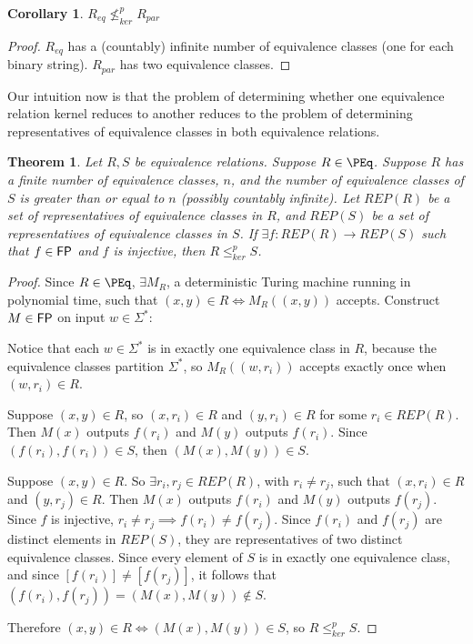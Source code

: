 \documentclass{amsart}
\newtheorem{theorem}{Theorem}[section]
\newtheorem{corollary}[corollary]{Corollary}
\theoremstyle{definition} \newtheorem{definition}[definition]{Definition}
\newcommand{\sigmastar}{\Sigma^{*}} %
\newcommand{\kr}{\leq^{p}_{ker}} %
\newcommand{\nkr}{\nleq^{p}_{ker}} %
\begin{document}
\begin{corollary}
  $R_{eq}\nkr R_{par}$
\end{corollary}
\begin{proof}
  $R_{eq}$ has a (countably) infinite number of equivalence classes (one for
  each binary string). $R_{par}$ has two equivalence classes.
\end{proof}

Our intuition now is that the problem of determining whether one equivalence
relation kernel reduces to another reduces to the problem of determining
representatives of equivalence classes in both equivalence relations.

\begin{theorem}\label{thm:repr_kr}
  Let $R,S$ be equivalence relations. Suppose $R\in\PEq$. Suppose $R$ has a
  finite number of equivalence classes, $n$, and the number of equivalence
  classes of $S$ is greater than or equal to $n$ (possibly countably
  infinite). Let $REP(R)$ be a set of representatives of equivalence classes in
  $R$, and $REP(S)$ be a set of representatives of equivalence classes in $S$.
  If $\exists f\colon REP(R)\to REP(S)$ such that $f\in{\ensuremath{\mathsf{FP}}}$ and $f$ is
  injective, then $R\kr S$.
\end{theorem}
\begin{proof}
  Since $R\in\PEq$, $\exists M_R$, a deterministic Turing machine running in
  polynomial time, such that $(x,y)\in R\iff M_R((x,y))$ accepts. Construct
  $M\in{\ensuremath{\mathsf{FP}}}$ on input $w\in\sigmastar$:\\
  \begin{algorithm}[H]
  \end{algorithm}
  Notice that each $w\in\sigmastar$ is in exactly one equivalence class in $R$,
  because the equivalence classes partition $\sigmastar$, so $M_R((w,r_i))$
  accepts exactly once when $(w,r_i)\in R$.

  Suppose $(x,y)\in R$, so $(x, r_i)\in R$ and $(y,r_i)\in R$ for some $r_i\in
  REP(R)$. Then $M(x)$ outputs $f(r_i)$ and $M(y)$ outputs $f(r_i)$. Since
  $(f(r_i), f(r_i))\in S$, then $(M(x), M(y))\in S$.

  Suppose $(x,y)\in R$. So $\exists r_i, r_j\in REP(R)$, with $r_i\neq r_j$,
  such that $(x,r_i)\in R$ and $(y, r_j)\in R$. Then $M(x)$ outputs $f(r_i)$
  and $M(y)$ outputs $f(r_j)$. Since $f$ is injective, $r_i\neq r_j\implies
  f(r_i)\neq f(r_j)$. Since $f(r_i)$ and $f(r_j)$ are distinct elements in
  $REP(S)$, they are representatives of two distinct equivalence classes. Since
  every element of $S$ is in exactly one equivalence class, and since
  $[f(r_i)]\neq[f(r_j)]$, it follows that $(f(r_i), f(r_j))=(M(x), M(y))\notin
  S$.

  Therefore $(x,y)\in R\iff (M(x), M(y))\in S$, so $R\kr S$.
\end{proof}
\end{document}

